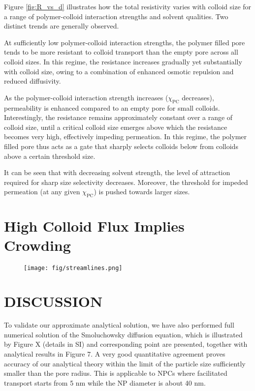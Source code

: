 \documentclass[12pt, a4paper]{article}
\begin{document}
Figure \ref{fig:R_vs_d} illustrates how the total resistivity varies with colloid size for a range of polymer-colloid interaction strengths and solvent qualities. 
Two distinct trends are generally observed.

At sufficiently low polymer-colloid interaction strengths, the polymer filled pore tends to be more resistant to colloid transport than the empty pore across  all colloid sizes. 
In this regime, the resistance increases gradually yet substantially with colloid size, owing to a combination of enhanced osmotic repulsion and reduced diffusivity.

As the polymer-colloid interaction strength increases ($\chi_{\text{PC}}$ decreases), permeability is enhanced compared to an empty pore for small colloids. 
Interestingly, the resistance remains approximately constant over a range of colloid size, until a critical colloid size emerges above which the resistance becomes very high, 
effectively impeding permeation. 
In this regime, the polymer filled pore thus acts as a gate that sharply selects colloids below from colloids above a certain threshold size.

It can be seen that with decreasing solvent strength, the level of attraction required for sharp size selectivity decreases. 
Moreover, the threshold for impeded permeation (at any given $\chi_{\text{PC}}$) is pushed towards larger sizes.


\section{High Colloid Flux Implies Crowding}

\begin{figure}
    \centering
    \texttt{[image: fig/streamlines.png]}
\end{figure}

\section{DISCUSSION}


To validate our approximate analytical solution, we have also performed full numerical solution of the Smoluchowsky diffusion equation, which is illustrated by Figure X 
(details in SI) and corresponding point are presented, together with analytical results in Figure 7. A very good quantitative agreement proves accuracy of our analytical theory
within the limit of the particle size sufficiently smaller than the pore radius. This is applicable to NPCs where facilitated transport starts from 5 nm while the
NP diameter is about 40 nm.
\end{document}
